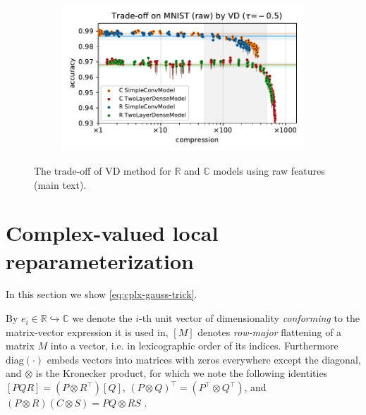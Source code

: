 \documentclass[a4paper,10pt,twocolumn]{article}
\newcommand{\real}{\mathbb{R}}
\newcommand{\cplx}{\mathbb{C}}
\newcommand{\diag}[1]{\mathrm{diag}{#1}}
\begin{document}
\begin{figure}[b]
\begin{subfigure}[b]{0.5\columnwidth}
  \end{subfigure}%
  \begin{subfigure}[b]{0.5\columnwidth}
    \centering
    \includegraphics[width=\linewidth]{figure__mnist-like__trade-off/legacy__VD__mnist__raw__-0.5.pdf}
  \end{subfigure}
  \caption{%
    The trade-off of VD method for $\real$ and $\cplx$ models using raw features (main text).
  }
  \label{fig:paper__mnist-like__trade-off__VD__raw}
\end{figure}



\section{Complex-valued local reparameterization} %
\label{sec:complex_valued_local_reparameterization}

In this section we show \eqref{eq:cplx-gauss-trick}.

By $e_i\in \real \hookrightarrow \cplx$ we denote the $i$-th unit vector of dimensionality
\emph{conforming} to the matrix-vector expression it is used in, $[M]$ denotes \emph{row-major}
flattening of a matrix $M$ into a vector, i.e. in lexicographic order of its indices.
Furthermore $\diag{(\cdot)}$ embeds vectors into matrices with zeros everywhere except
the diagonal, and $\otimes$ is the Kronecker product, for which we note the following
identities $
  [P Q R] = (P \otimes R^\top) [Q]
$, $
  (P \otimes Q)^\top = (P^\top \otimes Q^\top)
$, and $
  (P \otimes R) (C \otimes S) = P Q \otimes R S
$ \citep{petersen_matrix_2012}.
\end{document}

